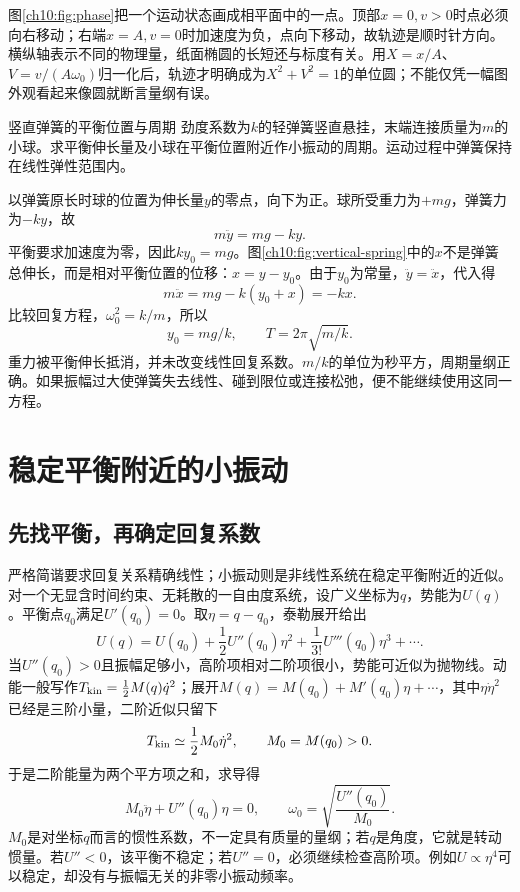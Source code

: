 \chTenPhaseFigure
图\ref{ch10:fig:phase}把一个运动状态画成相平面中的一点。顶部$x=0,v>0$时点必须向右移动；右端$x=A,v=0$时加速度为负，点向下移动，故轨迹是顺时针方向。横纵轴表示不同的物理量，纸面椭圆的长短还与标度有关。用$X=x/A$、$V=v/(A\omega_0)$归一化后，轨迹才明确成为$X^2+V^2=1$的单位圆；不能仅凭一幅图外观看起来像圆就断言量纲有误。

\begin{origexamplebox}{竖直弹簧的平衡位置与周期}\label{ch10:ex:vertical-spring}
劲度系数为$k$的轻弹簧竖直悬挂，末端连接质量为$m$的小球。求平衡伸长量及小球在平衡位置附近作小振动的周期。运动过程中弹簧保持在线性弹性范围内。
\end{origexamplebox}
\begin{xesolution}
以弹簧原长时球的位置为伸长量$y$的零点，向下为正。球所受重力为$+mg$，弹簧力为$-ky$，故
\[
 m\ddot y=mg-ky.
\]
平衡要求加速度为零，因此$ky_0=mg$。图\ref{ch10:fig:vertical-spring}中的$x$不是弹簧总伸长，而是相对平衡位置的位移：$x=y-y_0$。由于$y_0$为常量，$\ddot y=\ddot x$，代入得
\[
 m\ddot x=mg-k(y_0+x)=-kx.
\]
\chTenVerticalFigure
比较回复方程，$\omega_0^2=k/m$，所以
\[
 \boxed{y_0=mg/k},\qquad \boxed{T=2\pi\sqrt{m/k}}.
\]
重力被平衡伸长抵消，并未改变线性回复系数。$m/k$的单位为秒平方，周期量纲正确。如果振幅过大使弹簧失去线性、碰到限位或连接松弛，便不能继续使用这同一方程。
\end{xesolution}

\section{稳定平衡附近的小振动}\label{ch10:sec:small}
\subsection{先找平衡，再确定回复系数}
严格简谐要求回复关系精确线性；小振动则是非线性系统在稳定平衡附近的近似。对一个无显含时间约束、无耗散的一自由度系统，设广义坐标为$q$，势能为$U(q)$。平衡点$q_0$满足$U'(q_0)=0$。取$\eta=q-q_0$，泰勒展开给出
\[
 U(q)=U(q_0)+\frac12U''(q_0)\eta^2
 +\frac1{3!}U'''(q_0)\eta^3+\cdots.
\]
当$U''(q_0)>0$且振幅足够小，高阶项相对二阶项很小，势能可近似为抛物线。动能一般写作$T_{\rm kin}=\tfrac12M(q)\dot q^2$；展开$M(q)=M(q_0)+M'(q_0)\eta+\cdots$，其中$\eta\dot\eta^2$已经是三阶小量，二阶近似只留下
\[
 T_{\rm kin}\simeq\frac12M_0\dot\eta^2,\qquad M_0=M(q_0)>0.
\]
于是二阶能量为两个平方项之和，求导得
\begin{equation}\label{ch10:eq:small-frequency}
 M_0\ddot\eta+U''(q_0)\eta=0,
 \qquad \omega_0=\sqrt{\frac{U''(q_0)}{M_0}}.
\end{equation}
$M_0$是对坐标$q$而言的惯性系数，不一定具有质量的量纲；若$q$是角度，它就是转动惯量。若$U''<0$，该平衡不稳定；若$U''=0$，必须继续检查高阶项。例如$U\propto\eta^4$可以稳定，却没有与振幅无关的非零小振动频率。

